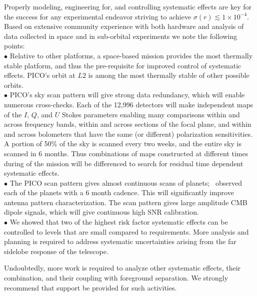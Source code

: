 \documentclass[PICOReport.tex]{subfiles}
\begin{document}
Properly modeling, engineering for, and controlling systematic effects are key for the success for any experimental endeavor striving to achieve $\sigma(r) \lesssim 1 \times 10^{-4}$. Based on extensive community experience with both hardware and analysis of data collected in space and in sub-orbital experiments we note the following points: \\
$\bullet$ \hspace{0.1in}  Relative to other platforms, a space-based mission provides the most thermally stable platform, and thus the pre-requisite for improved control of systematic effects. PICO's orbit at $L2$ is among the most thermally stable of other possible orbits. \\
$\bullet$ \hspace{0.1in} PICO's sky scan pattern will give strong data redundancy, which will enable numerous cross-checks. Each of the 12,996 detectors will make independent maps of the $I,\,Q$, and $U$ Stokes parameters enabling many comparisons within and across frequency bands, within and across sections of the focal plane, and within and across bolometers that have the same (or different) polarization sensitivities. A portion of 50\% of the sky is scanned every two weeks, and the entire sky is scanned in 6 months. Thus combinations of maps constructed at different times during of the mission will be differenced to search for residual time dependent systematic effects. \\
$\bullet$ \hspace{0.1in}  The PICO scan pattern gives almost continuous scans of planets; \planck\ observed each of the planets with a 6 month cadence. This will significantly improve antenna pattern characterization. The scan pattern gives large amplitude CMB dipole signals, which will give continuous high \ac{SNR} calibration. \\
$\bullet$ \hspace{0.1in}  We showed that two of the highest risk factor systematic effects can be controlled to levels that are small compared to requirements. More analysis and planning is required to address systematic uncertainties arising from the far sidelobe response of the telescope. 

Undoubtedly, more work is required to analyze other systematic effects, their combination, and their coupling with foreground separation. We strongly recommend that support be provided for such activities. 

\end{document}
